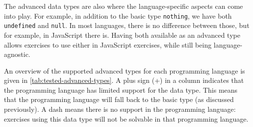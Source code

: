 \documentclass[../main]{subfiles}
\begin{document}
The advanced data types are also where the language-specific aspects can come into play.
For example, in addition to the basic type \texttt{nothing}, we have both \texttt{undefined} and \texttt{null}.
In most languages, there is no difference between those, but for example, in JavaScript there is.
Having both available as an advanced type allows exercises to use either in JavaScript exercises, while still being language-agnostic.

An overview of the supported advanced types for each programming language is given in \cref{tab:tested-advanced-types}.
A plus sign (+) in a column indicates that the programming language has limited support for the data type.
This means that the programming language will fall back to the basic type (as discussed previously).
A dash means there is no support in the programming language: exercises using this data type will not be solvable in that programming language.
\end{document}

